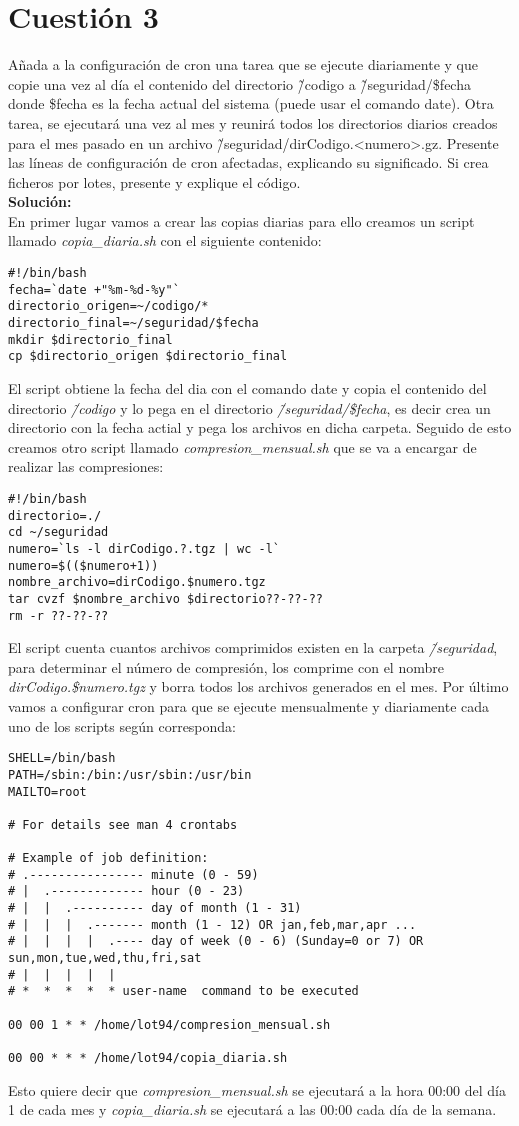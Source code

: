 \documentclass[a4paper, 10pt]{article} %
\begin{document}
\section{Cuestión 3}
Añada a la configuración de cron una tarea que se ejecute diariamente y que copie una vez al día el contenido del directorio \~/codigo a \~/seguridad/\$fecha donde \$fecha es la fecha actual del sistema (puede usar el comando date). Otra tarea, se ejecutará una vez al mes y reunirá todos los directorios diarios creados para el mes pasado en un archivo \~/seguridad/dirCodigo.<numero>.gz. Presente las líneas de configuración de cron afectadas, explicando su significado. Si crea ficheros por lotes, presente y explique el código.\\
\textbf{Solución:}\\
En primer lugar vamos a crear las copias diarias para ello creamos un script llamado \textit{copia\_diaria.sh} con el siguiente contenido:
\begin{verbatim}
#!/bin/bash
fecha=`date +"%m-%d-%y"`
directorio_origen=~/codigo/*
directorio_final=~/seguridad/$fecha
mkdir $directorio_final
cp $directorio_origen $directorio_final
\end{verbatim}
El script obtiene la fecha del dia con el comando date y copia el contenido del directorio \textit{\~/codigo} y lo pega en el directorio \textit{\~/seguridad/\$fecha}, es decir crea un directorio con la fecha actial y pega los archivos en dicha carpeta. Seguido de esto creamos otro script llamado \textit{compresion\_mensual.sh} que se va a encargar de realizar las compresiones:
\begin{verbatim}
#!/bin/bash
directorio=./
cd ~/seguridad
numero=`ls -l dirCodigo.?.tgz | wc -l`
numero=$(($numero+1))
nombre_archivo=dirCodigo.$numero.tgz
tar cvzf $nombre_archivo $directorio??-??-??
rm -r ??-??-??
\end{verbatim}
El script cuenta cuantos archivos comprimidos existen en la carpeta \textit{\~/seguridad}, para determinar el número de compresión, los comprime con el nombre \textit{dirCodigo.\$numero.tgz} y borra todos los archivos generados en el mes. Por último vamos a configurar cron para que se ejecute mensualmente y diariamente cada uno de los scripts según corresponda:
\begin{verbatim}
SHELL=/bin/bash
PATH=/sbin:/bin:/usr/sbin:/usr/bin
MAILTO=root

# For details see man 4 crontabs

# Example of job definition:
# .---------------- minute (0 - 59)
# |  .------------- hour (0 - 23)
# |  |  .---------- day of month (1 - 31)
# |  |  |  .------- month (1 - 12) OR jan,feb,mar,apr ...
# |  |  |  |  .---- day of week (0 - 6) (Sunday=0 or 7) OR sun,mon,tue,wed,thu,fri,sat
# |  |  |  |  |
# *  *  *  *  * user-name  command to be executed

00 00 1 * * /home/lot94/compresion_mensual.sh

00 00 * * * /home/lot94/copia_diaria.sh
\end{verbatim}
Esto quiere decir que \textit{compresion\_mensual.sh} se ejecutará a la hora 00:00 del día 1 de cada mes y \textit{copia\_diaria.sh} se ejecutará a las 00:00 cada día de la semana.
\end{document}
